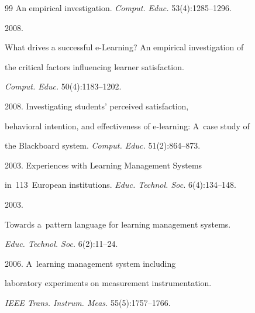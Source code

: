 {{\begin{thebibliography}{99}
An empirical investigation. \textit{Comput. Educ.} 53(4):1285--1296.







 2008. 


What drives a successful e-Learning? An empirical investigation of 


the critical factors influencing learner satisfaction. 


\textit{Comput. Educ.} 50(4):1183--1202.







 2008. Investigating students' perceived satisfaction, 


behavioral intention, and effectiveness of e-learning: A~case study of 


the Blackboard system. \textit{Comput. Educ.} 51(2):864--873.







 2003. Experiences with Learning Management Systems 


in~113~European institutions. \textit{Educ. Technol. Soc.} 6(4):134--148.







 2003. 


Towards a~pattern language for learning management systems. 


\textit{Educ. Technol.  Soc.} 6(2):11--24.







 2006. A~learning management system including 


laboratory experiments on measurement instrumentation. 


\textit{IEEE Trans. Instrum. Meas.} 55(5):1757--1766.










\end{thebibliography}}}
